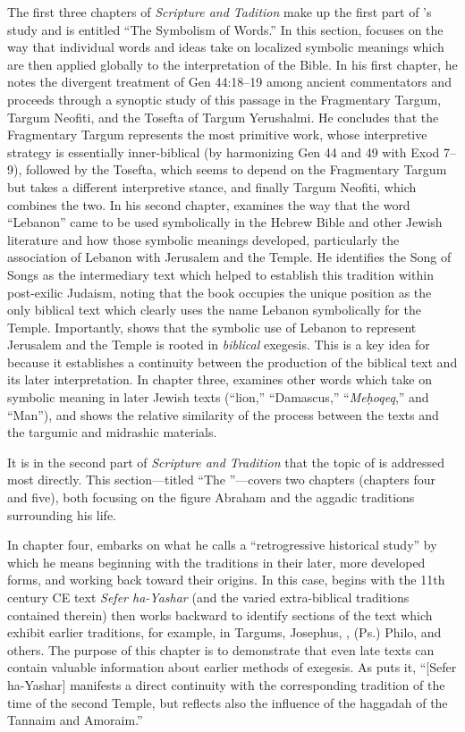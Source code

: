 The first three chapters of \emph{Scripture and Tadition} make up the
first part of \vermes's study and is entitled ``The
Symbolism of Words.'' In this section, \vermes focuses
on the way that individual words and ideas take on localized symbolic
meanings which are then applied globally to the interpretation of the
Bible. In his first chapter, he notes the divergent treatment of Gen
44:18--19 among ancient commentators and proceeds through a synoptic
study of this passage in the Fragmentary Targum, Targum Neofiti, and the
Tosefta of Targum Yerushalmi. He concludes that the Fragmentary Targum
represents the most primitive work, whose interpretive strategy is
essentially inner-biblical (by harmonizing Gen 44 and 49 with Exod
7--9), followed by the Tosefta, which seems to depend on the Fragmentary
Targum but takes a different interpretive stance, and finally Targum
Neofiti, which combines the two. In his second chapter,
\vermes examines the way that the word ``Lebanon'' came
to be used symbolically in the Hebrew Bible and other Jewish literature
and how those symbolic meanings developed, particularly the association
of Lebanon with Jerusalem and the Temple. He identifies the Song of
Songs as the intermediary text which helped to establish this tradition
within post-exilic Judaism, noting that the book occupies the unique
position as the only biblical text which clearly uses the name Lebanon
symbolically for the Temple. Importantly, \vermes shows
that the symbolic use of Lebanon to represent Jerusalem and the Temple
is rooted in \emph{biblical} exegesis. This is a key idea for
\vermes because it establishes a continuity between the
production of the biblical text and its later interpretation. In chapter
three, \vermes examines other words which take on
symbolic meaning in later Jewish texts (``lion,'' ``Damascus,''
``\emph{Meḥoqeq},'' and ``Man''), and shows the relative similarity of
the process between the \dss texts and the targumic and
midrashic materials.

It is in the second part of \emph{Scripture and Tradition} that the
topic of \RwB is addressed most directly. This
section---titled ``The \RwB''---covers two chapters
(chapters four and five), both focusing on the figure Abraham and the
aggadic traditions surrounding his life.

In chapter four, \vermes embarks on what he calls a
``retrogressive historical study'' by which he means beginning with the
traditions in their later, more developed forms, and working back toward
their origins. In this case, \vermes begins with the
11th century CE text \emph{Sefer ha-Yashar} (and the varied
extra-biblical traditions contained therein) then works backward to
identify sections of the text which exhibit earlier traditions, for
example, in Targums, Josephus, \jub, (Ps.) Philo, and
others. The purpose of this chapter is to demonstrate that even late
texts can contain valuable information about earlier methods of
exegesis. As \vermes puts it, ``{[}Sefer ha-Yashar{]}
manifests a direct continuity with the corresponding tradition of the
time of the second Temple, but reflects also the influence of the
haggadah of the Tannaim and Amoraim.''\autocite[95]{vermes1961}

